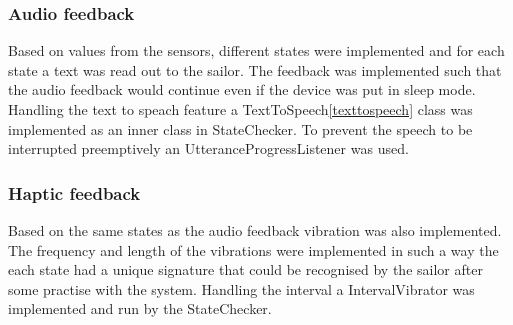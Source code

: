 \subsubsection{Audio feedback}
Based on values from the sensors, different states were implemented and for each state a text was read out to the sailor. The feedback was implemented such that the audio feedback would continue even if the device was put in sleep mode. Handling the text to speach feature a TextToSpeech\ref{texttospeech} class was implemented as an inner class in StateChecker. To prevent the speech to be interrupted preemptively an UtteranceProgressListener\cite{utter} was used. 

\subsubsection{Haptic feedback}
Based on the same states as the audio feedback vibration was also implemented. The frequency and length of the vibrations were implemented in such a way the each state had a unique signature that could be recognised by the sailor after some practise with the system. Handling the interval a IntervalVibrator was implemented and run by the StateChecker.

